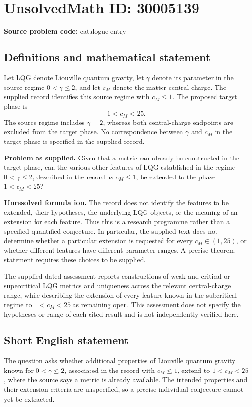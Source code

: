 \documentclass[11pt]{article}
\begin{document}
\section*{UnsolvedMath ID: 30005139}
\textbf{Source problem code:} catalogue entry
\subsection{Definitions and mathematical statement}
Let LQG denote Liouville quantum gravity, let \(\gamma\) denote its parameter in the source regime \(0<\gamma\leq 2\), and let \(c_M\) denote the matter central charge. The supplied record identifies this source regime with \(c_M\leq 1\). The proposed target phase is
\[
1<c_M<25.
\]
The source regime includes \(\gamma=2\), whereas both central-charge endpoints are excluded from the target phase. No correspondence between \(\gamma\) and \(c_M\) in the target phase is specified in the supplied record.

\textbf{Problem as supplied.} Given that a metric can already be constructed in the target phase, can the various other features of LQG established in the regime \(0<\gamma\leq 2\), described in the record as \(c_M\leq 1\), be extended to the phase \(1<c_M<25\)?

\textbf{Unresolved formulation.} The record does not identify the features to be extended, their hypotheses, the underlying LQG objects, or the meaning of an extension for each feature. Thus this is a research programme rather than a specified quantified conjecture. In particular, the supplied text does not determine whether a particular extension is requested for every \(c_M\in(1,25)\), or whether different features have different parameter ranges. A precise theorem statement requires these choices to be supplied.

The supplied dated assessment reports constructions of weak and critical or supercritical LQG metrics and uniqueness across the relevant central-charge range, while describing the extension of every feature known in the subcritical regime to \(1<c_M<25\) as remaining open. This assessment does not specify the hypotheses or range of each cited result and is not independently verified here.
\subsection{Short English statement}
The question asks whether additional properties of Liouville quantum gravity known for \(0<\gamma\leq2\), associated in the record with \(c_M\leq1\), extend to \(1<c_M<25\), where the source says a metric is already available. The intended properties and their extension criteria are unspecified, so a precise individual conjecture cannot yet be extracted.
\end{document}
